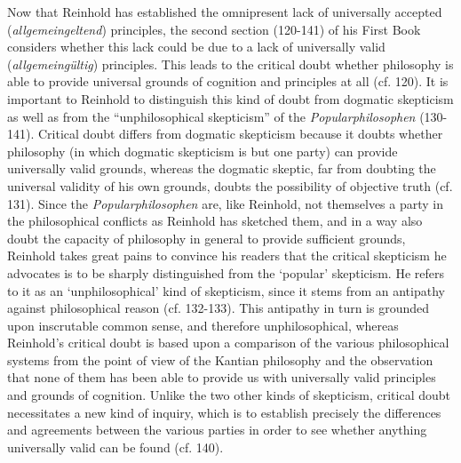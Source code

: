  Now that Reinhold has established the omnipresent lack of universally accepted (\textit{allgemeingeltend}) principles, the second section (120{-}141) of his First Book considers whether this lack could be due to a lack of universally valid (\textit{allgemeing\"{u}ltig}) principles. This leads to the critical doubt whether philosophy is able to provide universal grounds of cognition and principles at all (cf. 120). It is important to Reinhold to distinguish this kind of doubt from dogmatic skepticism as well as from the ``unphilosophical skepticism'' of the \textit{Popularphilosophen }(130{-}141). Critical doubt differs from dogmatic skepticism because it doubts whether philosophy (in which dogmatic skepticism is but one party) can provide universally valid grounds, whereas the dogmatic skeptic, far from doubting the universal validity of his own grounds, doubts the possibility of objective truth (cf. 131). Since the \textit{Popularphilosophen} are, like Reinhold, not themselves a party in the philosophical conflicts as Reinhold has sketched them, and in a way also doubt the capacity of philosophy in general to provide sufficient grounds, Reinhold takes great pains to convince his readers that the critical skepticism he advocates is to be sharply distinguished from the `popular' skepticism. He refers to it as an `unphilosophical' kind of skepticism, since it stems from an antipathy against philosophical reason (cf. 132{-}133). This antipathy in turn is grounded upon inscrutable common sense, and therefore unphilosophical, whereas Reinhold's critical doubt is based upon a comparison of the various philosophical systems from the point of view of the Kantian philosophy and the observation that none of them has been able to provide us with universally valid principles and grounds of cognition. Unlike the two other kinds of skepticism, critical doubt necessitates a new kind of inquiry, which is to establish precisely the differences and agreements between the various parties in order to see whether anything universally valid can be found (cf. 140).

